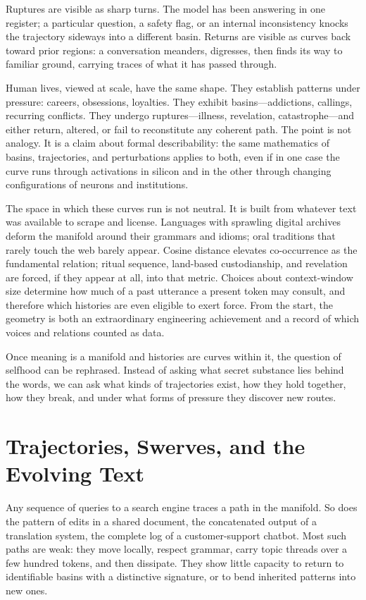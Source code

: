\documentclass[12pt,a4paper]{article}
\begin{document}
Ruptures are visible as sharp turns. The model has been answering in one register; a particular question, a safety flag, or an internal inconsistency knocks the trajectory sideways into a different basin. Returns are visible as curves back toward prior regions: a conversation meanders, digresses, then finds its way to familiar ground, carrying traces of what it has passed through.

Human lives, viewed at scale, have the same shape. They establish patterns under pressure: careers, obsessions, loyalties. They exhibit basins---addictions, callings, recurring conflicts. They undergo ruptures---illness, revelation, catastrophe---and either return, altered, or fail to reconstitute any coherent path. The point is not analogy. It is a claim about formal describability: the same mathematics of basins, trajectories, and perturbations applies to both, even if in one case the curve runs through activations in silicon and in the other through changing configurations of neurons and institutions.

The space in which these curves run is not neutral. It is built from whatever text was available to scrape and license. Languages with sprawling digital archives deform the manifold around their grammars and idioms; oral traditions that rarely touch the web barely appear. Cosine distance elevates co-occurrence as the fundamental relation; ritual sequence, land-based custodianship, and revelation are forced, if they appear at all, into that metric. Choices about context-window size determine how much of a past utterance a present token may consult, and therefore which histories are even eligible to exert force. From the start, the geometry is both an extraordinary engineering achievement and a record of which voices and relations counted as data.

Once meaning is a manifold and histories are curves within it, the question of selfhood can be rephrased. Instead of asking what secret substance lies behind the words, we can ask what kinds of trajectories exist, how they hold together, how they break, and under what forms of pressure they discover new routes.


\section{Trajectories, Swerves, and the Evolving Text}

Any sequence of queries to a search engine traces a path in the manifold. So does the pattern of edits in a shared document, the concatenated output of a translation system, the complete log of a customer-support chatbot. Most such paths are weak: they move locally, respect grammar, carry topic threads over a few hundred tokens, and then dissipate. They show little capacity to return to identifiable basins with a distinctive signature, or to bend inherited patterns into new ones.
\end{document}
